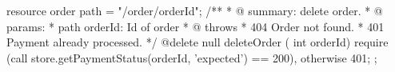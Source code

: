 resource order  { 
     path = "/order/{orderId}"; 
      /**
      * @ summary: delete order.
      * @ params:
      *       path orderId: Id of order
      * @ throws
      *       404 Order not found.
      *       401 Payment already processed.
      */
      @delete null deleteOrder ( int orderId)
           require (call store.getPaymentStatus(orderId, 'expected') == 200),
           otherwise 401;
};